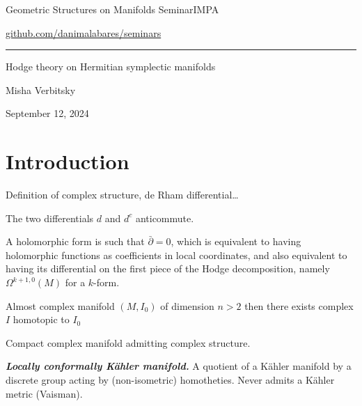 


\begin{minipage}{\textwidth}
	\begin{minipage}{1\textwidth}
		Geometric Structures on Manifolds Seminar\hfill IMPA
		
		{\small\hfill\href{https://github.com/danimalabares/seminars}{github.com/danimalabares/seminars}}
		
	\end{minipage}
\end{minipage}\vspace{.2cm}\hrule

\vspace{10pt}

{\Huge Hodge theory on Hermitian symplectic manifolds}

\hfill{\Large Misha Verbitsky}

\hfill{\large September 12, 2024}

\tableofcontents

\section{Introduction}

Definition of complex structure, de Rham differential…

\begin{remark}
The two differentials $d$ and $d^c$ anticommute.
\end{remark}

\begin{remark}
	A holomorphic form is such that $ \bar{\partial} =0$, which is equivalent to having holomorphic functions as coefficients in local coordinates, and also equivalent to having its differential on the first piece of the Hodge decomposition, namely $\Omega^{k+1,0}(M)$ for a $k$-form.
\end{remark}

\begin{conjecture} 
	Almost complex manifold $(M,I_0)$ of dimension $n>2$ then there exists complex $I$ homotopic to $I_0$
\end{conjecture}

\begin{defn}
	Compact complex manifold admitting complex structure.

	\textit{\textbf{Locally conformally K\"ahler manifold.}} A quotient of a K\"ahler manifold by a discrete group acting by (non-isometric) homotheties. Never admits a K\"ahler metric (Vaisman).
\end{defn}

